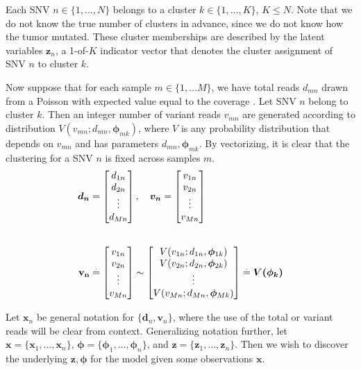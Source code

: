 \documentclass[11pt]{article}
\newcommand{\bx}{\ensuremath{\mathbf{x}}}
\newcommand{\bz}{\ensuremath{\mathbf{z}}}
\newcommand{\bphi}{\ensuremath{\bm{\phi}}}
\newcommand{\defeq}{\stackrel{.}{=}}
\begin{document}
Each SNV $n \in \{1, ..., N\}$ belongs to a cluster $k\in\{1,\ldots,K\}$, $K \leq N$. Note that we do not know the true number of clusters in advance, since we do not know how the tumor mutated. These cluster memberships are described by the latent variables $\bz_n$, a 1-of-$K$ indicator vector that denotes the cluster assignment of SNV $n$ to cluster $k$. 

Now suppose that for each sample $m\in\{1, \ldots M\}$, we have total reads $d_{mn}$ drawn from a Poisson with expected value equal to the coverage \cite{Lander1988}. Let SNV $n$ belong to cluster $k$. Then an integer number of variant reads $v_{mn}$ are generated according to distribution $V(v_{mn}; d_{mn}, \bphi_{mk})$, where $V$ is any probability distribution that depends on $v_{mn}$ and has parameters $d_{mn}, \bphi_{mk}$. By vectorizing, it is clear that the clustering for a SNV $n$ is fixed across samples $m$.
\begin{align}
\bm{d_{n}} &= 	\begin{bmatrix} d_{1n} \\ d_{2n} \\ \vdots \\ d_{Mn} \end{bmatrix}, \quad\bm{v_{n}} = 	\begin{bmatrix} v_{1n} \\ v_{2n} \\ \vdots \\ v_{Mn} \end{bmatrix}	\\[20pt]
	\bf{v}_{n} &\defeq 
				\begin{bmatrix}
				 	v_{1n} \\ v_{2n} \\ \vdots \\ v_{Mn}
				\end{bmatrix}
				\sim
				\begin{bmatrix}
					V(v_{1n}; d_{1n}, \bphi_{1k}) \\ V(v_{2n}; d_{2n}, \bphi_{2k}) \\ \vdots \\ V(v_{Mn}; d_{Mn}, \bphi_{Mk})
				\end{bmatrix}
				\defeq \bm{V(\bphi_k)}
\end{align}

Let $\bx_{n}$ be general notation for $\{\bm{d}_{n}, \bm{v}_{n}\}$, where the use of the total or variant reads will be clear from context. Generalizing notation further, let $\bx = \{\bx_1, \ldots, \bx_n\}$, $\bphi = \{\bphi_1, \ldots, \bphi_n\}$, and $\bz = \{\bz_1, \ldots, \bz_n\}$. Then we wish to discover the underlying $\bz, \bphi$ for the model given some observations $\bx$.
\end{document}
